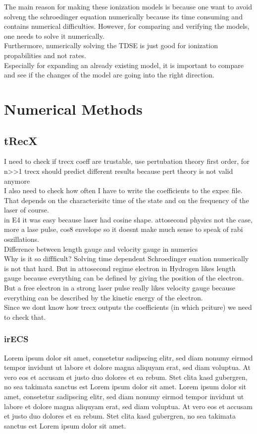 The main reason for making these ionization models is because one want to avoid solveng the schroedinger equation numerically because its time consuming and contains numerical difficulties.
However, for comparing and verifying the models, one needs to solve it numerically.\\
Furthermore, numerically solving the TDSE is just good for ionization propabilities and not rates.\\
Especially for expanding an already existing model, it is important to compare and see if the changes of the model are going into the right direction.



\section{Numerical Methods}



\subsection{tRecX}
I need to check if trecx coeff are trustable, use pertubation theory first order, for n>>1 trecx should predict different results because pert theory is not valid anymore\\
I also need to check how often I have to write the coefficients to the expec file. That depends on the characterisitc time of the state and on the frequency of the laser of course.\\
in E4 it was easy because laser had cosine shape. attosecond physics not the case, more a lase pulse, cos8 envelope so it doesnt make much sense to speak of rabi oszillations.\\
Difference between length gauge and velocity gauge in numerics\\
Why is it so diffficult? Solving time dependent Schroedinger euation numerically is not that hard. But in attosecond regime electron in Hydrogen likes length gauge because everything can be defined by giving the position of the electron. 
But a free electron in a strong laser pulse really likes velocity gauge because everything can be described by the kinetic energy of the electron.\\
Since we dont know how trecx outputs the coefficients (in which pciture) we need to check that.
\subsubsection{irECS}
Lorem ipsum dolor sit amet, consetetur sadipscing elitr, sed diam nonumy eirmod tempor invidunt ut labore et dolore magna aliquyam erat, sed diam voluptua. At vero eos et accusam et justo duo dolores et ea rebum. Stet clita kasd gubergren, no sea takimata sanctus est Lorem ipsum dolor sit amet. Lorem ipsum dolor sit amet, consetetur sadipscing elitr, sed diam nonumy eirmod tempor invidunt ut labore et dolore magna aliquyam erat, sed diam voluptua. At vero eos et accusam et justo duo dolores et ea rebum. Stet clita kasd gubergren, no sea takimata sanctus est Lorem ipsum dolor sit amet.
